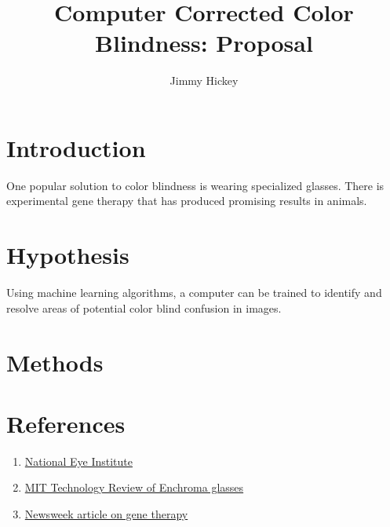 \documentclass[12pt]{article}
\title{
Computer Corrected Color Blindness: Proposal
}
\author{Jimmy Hickey}
\begin{document}
\maketitle
\doublespacing


\section{Introduction}

One popular solution to color blindness is wearing specialized glasses.
There is experimental gene therapy that has produced promising results in animals. 

\section{Hypothesis}
Using machine learning algorithms, a computer can be trained to identify and resolve areas of potential color blind confusion in images.

\section{Methods}

\section{References}
\singlespacing
\begin{enumerate}
	\item 
		\href{https://nei.nih.gov/health/color_blindness/facts_about}{National Eye Institute}

	\item
		\href{https://www.technologyreview.com/s/601782/how-enchromas-glasses-correct-color-blindness/}{MIT Technology Review of Enchroma glasses}
	\item
		\href{http://www.newsweek.com/2015/05/22/cure-color-blindness-isnt-just-monkey-business-330258.html}{Newsweek article on gene therapy}
\end{enumerate}
\end{document}
